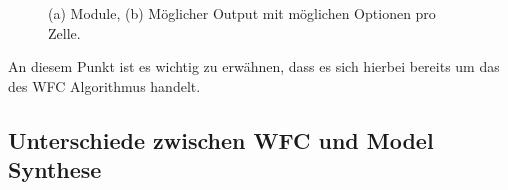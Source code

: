 \documentclass[12pt, a4paper,twoside,openany]{report} %
\begin{document}
\begin{figure}[H]
    \centering
    \qquad
    \caption{(a) Module, (b) Möglicher Output mit möglichen Optionen pro Zelle.}%
\end{figure}

An diesem Punkt ist es wichtig zu erwähnen,
dass es sich hierbei bereits um das  des WFC Algorithmus handelt.

\subsection{Unterschiede zwischen WFC und Model Synthese}
\end{document}
